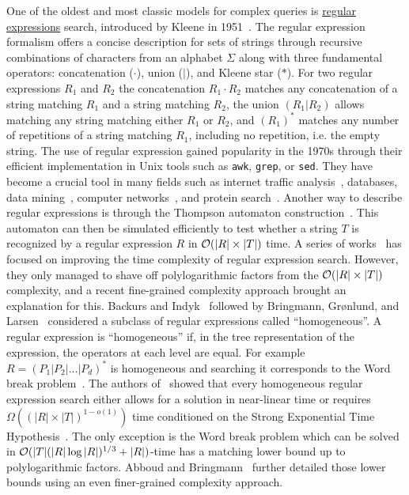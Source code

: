 One of the oldest and most classic models for complex queries is \ul{regular expressions} search, introduced by Kleene in 1951~\cite{RM-704}.
The regular expression formalism offers a concise description for sets of strings through recursive combinations of characters from an alphabet $\Sigma$ along with three fundamental operators: concatenation ($\cdot$), union ($|$), and Kleene star ($\ast$).
For two regular expressions $R_1$ and $R_2$ the concatenation $R_1\cdot R_2$ matches any concatenation of a string matching $R_1$ and a string matching $R_2$, the union $(R_1|R_2)$ allows matching any string matching either $R_1$ or $R_2$, and $(R_1)^\ast$ matches any number of repetitions of a string matching $R_1$, including no repetition, i.e. the empty string.
The use of regular expression gained popularity in the 1970s through their efficient implementation in Unix tools such as \texttt{awk}, \texttt{grep}, or \texttt{sed}.
They have become a crucial tool in many fields such as internet traffic analysis~\cite{4221791,4579527}, databases, data mining~\cite{1000341,10.5555/645927.672035,10.1145/375551.375569}, computer networks~\cite{10.1145/1159913.1159952}, and protein search~\cite{10.1145/369133.369220}.
Another way to describe regular expressions is through the Thompson automaton construction~\cite{Thompson_automaton}. This automaton can then be simulated efficiently to test whether a string $T$ is recognized by a regular expression $R$ in $\mathcal{O}(|R| \times |T|)$ time.
A series of works~\cite{10.1145/128749.128755,BILLE2008486,10.1007/978-3-642-02927-1_16,10.1007/11786986_56,doi:10.1137/1.9781611973075.104} has focused on improving the time complexity of regular expression search. However, they only managed to shave off polylogarithmic factors from the $\mathcal{O}(|R| \times |T|)$ complexity, and a recent fine-grained complexity approach brought an explanation for this.
Backurs and Indyk~\cite{DBLP:conf/focs/BackursI16} followed by Bringmann, Gr{\o}nlund, and Larsen~\cite{8104068} considered a subclass of regular expressions called ``homogeneous''. A regular expression is ``homogeneous'' if, in the tree representation of the expression, the operators at each level are equal. For example $R=(P_1|P_2|...|P_d)^\ast$ is homogeneous and searching it corresponds to the Word break problem~\cite{wordbreak1,wordbreak2}. The authors of~\cite{DBLP:conf/focs/BackursI16,8104068} showed that every homogeneous regular expression search either allows for a solution in near-linear time or requires $\Omega((|R| \times |T|)^{1-o(1)})$ time conditioned on the Strong Exponential Time Hypothesis~\cite{IMPAGLIAZZO2001367}. The only exception is the Word break problem which can be solved in $\mathcal{O}(|T| (|R| \log |R|)^{1/3}+|R|)$-time has a matching lower bound up to polylogarithmic factors. Abboud and Bringmann~\cite{DBLP:conf/icalp/AbboudB18} further detailed those lower bounds using an even finer-grained complexity approach.
